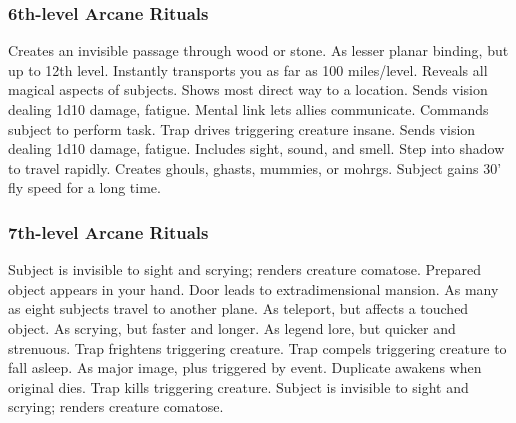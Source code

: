\subsubsection{6th-level Arcane Rituals}
\begin{rituallist}
     Creates an invisible passage through wood or stone.
     As lesser planar binding, but up to 12th level.
     Instantly transports you as far as 100 miles/level.
      Reveals all magical aspects of subjects.
     Shows most direct way to a location.
     Sends vision dealing 1d10 damage, fatigue.
     Mental link lets allies communicate.
     Commands subject to perform task.
     Trap drives triggering creature insane.
     Sends vision dealing 1d10 damage, fatigue.
     Includes sight, sound, and smell.
     Step into shadow to travel rapidly.
     Creates ghouls, ghasts, mummies, or mohrgs.
     Subject gains 30' fly speed for a long time.
\end{rituallist}

\subsubsection{7th-level Arcane Rituals}
\begin{rituallist}
     Subject is invisible to sight and scrying; renders creature comatose.
     Prepared object appears in your hand.
    \F Door leads to extradimensional mansion.
    \F As many as eight subjects travel to another plane.
     As teleport, but affects a touched object.
     As scrying, but faster and longer.
     As legend lore, but quicker and strenuous.
     Trap frightens triggering creature.
     Trap compels triggering creature to fall asleep.
     As major image, plus triggered by event.
    \F Duplicate awakens when original dies.
     Trap kills triggering creature.
     Subject is invisible to sight and scrying; renders creature comatose.
\end{rituallist}

